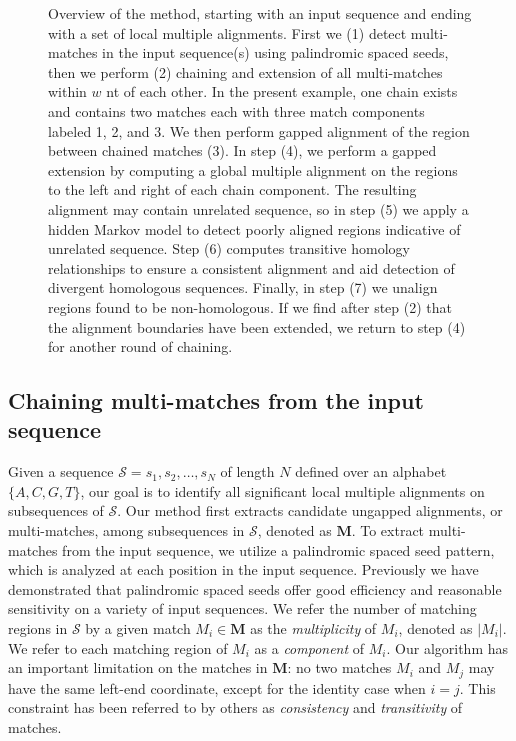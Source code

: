 \documentclass{llncs}
\begin{document}
\begin{figure}[p]
\begin{center}
\end{center}
\vspace{-1.6cm}
\caption{Overview of the method, starting with an input sequence and ending
with a set of local multiple alignments. First we (1) detect
multi-matches in the input sequence(s) using palindromic spaced seeds,
then we perform (2) chaining and extension of all multi-matches within
$w$ nt of each other.  In the present example, one chain exists and
contains two matches each with three match components labeled 1, 2,
and 3.  We then perform gapped alignment of the region between chained
matches (3).  In step (4), we perform a gapped extension by computing
a global multiple alignment on the regions to the left and right of
each chain component.  The resulting alignment may contain unrelated
sequence, so in step (5) we apply a hidden Markov model to detect
poorly aligned regions indicative of unrelated sequence.  Step (6)
computes transitive homology relationships to ensure a consistent
alignment and aid detection of divergent homologous sequences.
Finally, in step (7) we unalign regions found to be non-homologous.
If we find after step (2) that the alignment boundaries have been
extended, we return to step (4) for another round of chaining.}
\label{fig-main}
\end{figure}

\subsection{Chaining multi-matches from the input sequence}
Given a sequence $\mathcal{S}=s_1, s_2,\dots, s_N$ of length $N$
defined over an alphabet $\{A,C,G,T\}$, our goal is to identify all
significant local multiple alignments on subsequences of
$\mathcal{S}$. Our method first extracts candidate ungapped
alignments, or multi-matches, among subsequences in $\mathcal{S}$,
denoted as $\mathbf{M}$. To extract multi-matches from the input
sequence, we utilize a palindromic spaced seed pattern\cite{ref-zhang}, which is
analyzed at each position in the input sequence.  Previously we have
demonstrated that palindromic spaced seeds offer good efficiency and
reasonable sensitivity on a variety of input
sequences\cite{ref-procrast}.  We refer the number of matching regions
in $\mathcal{S}$ by a given match $M_i \in \mathbf{M}$ as the
\textit{multiplicity} of $M_i$, denoted as $|M_i|$. We refer to each
matching region of $M_i$ as a \textit{component} of $M_i$. Our
algorithm has an important limitation on the matches in $\mathbf{M}$:
no two matches $M_i$ and $M_j$ may have the same left-end coordinate,
except for the identity case when $i=j$.  This constraint has been
referred to by others as \textit{consistency} and
\textit{transitivity}\cite{ref-transitivity} of matches.
\end{document}
